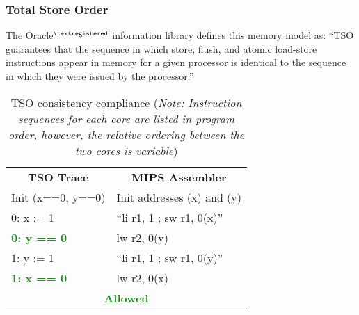 		\subsubsection{Total Store Order}
			The Oracle{\tiny{$^{\textregistered}$}} information library \cite{Oracle15} defines this memory model as: ``TSO guarantees that the sequence in which store, flush, and atomic load-store instructions appear in memory for a given processor is identical to the sequence in which they were issued by the processor.''
			
			\captionsetup[table]{name=Trace}
			\begin{table}[!hb]
			\begin{center}
			\selectfont
			\begin{tabular}{|l|l|}
				\hline
				\multicolumn{1}{|c|}{\textbf{TSO Trace}} & \multicolumn{1}{c|}{\textbf{MIPS Assembler}} \\
				Init (x==0, y==0) & Init addresses (x) and (y) \\
				\hline
				0: x := 1 & ``li r1, 1 ; sw r1, 0(x)'' \\
				\textbf{\textcolor{ForestGreen}{0: y == 0}} & lw r2, 0(y) \\
				1: y := 1 & ``li r1, 1 ; sw r1, 0(y)'' \\
				\textbf{\textcolor{ForestGreen}{1: x == 0}} & lw r2, 0(x) \\
				\hline
				\multicolumn{2}{|c|}{\textbf{\textcolor{ForestGreen}{Allowed}}} \\
				\hline
			\end{tabular}
			\caption[TSO consistency compliance]{TSO consistency compliance (\textit{Note: Instruction sequences for each core are listed in program order, however, the relative ordering between the two cores is variable})}
			\label{tso_compliance}
			\end{center} 
			\end{table}
			\captionsetup[table]{name=Table}
			
